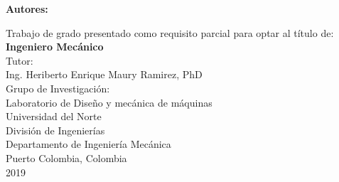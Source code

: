 \thispagestyle{empty}
\begin{center}
        \Large{ \textbf{ \uppercase{\TitleProject} } }
\end{center}
\vspace{2cm}
\begin{center}
    \large 
    \textbf{Autores:} \\
        \textbf{\AuthorProject}
\end{center}
\vspace{2cm}
\begin{center}
    Trabajo de grado presentado como requisito parcial para optar al título de:\\
    \textbf{Ingeniero Mecánico} \\
    \vspace{2cm}
    Tutor: \\
    Ing. Heriberto Enrique Maury Ramirez, PhD\\
    \vspace{2cm}
    Grupo de Investigación:\\
    Laboratorio de Diseño y mecánica de máquinas\\
    \vfill
    Universidad del Norte\\
    División de Ingenierías\\
    Departamento de Ingeniería Mecánica\\
    Puerto Colombia, Colombia\\
    2019
\end{center}